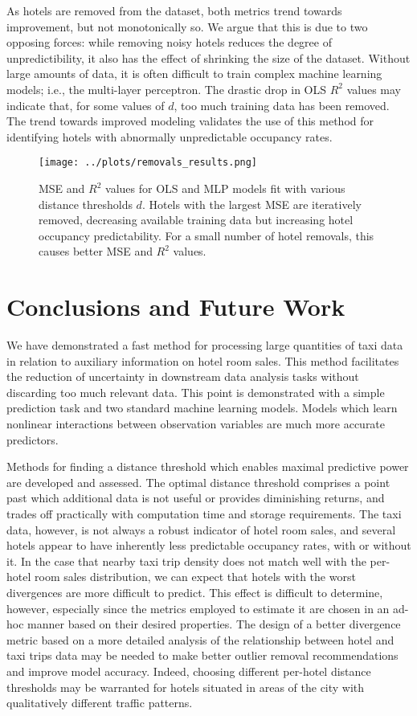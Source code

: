 \documentclass[useAMS, usenatbib]{biom}
\begin{document}
As hotels are removed from the dataset, both metrics trend towards improvement, but not monotonically so. We argue that this is due to two opposing forces: while removing noisy hotels reduces the degree of unpredictibility, it also has the effect of shrinking the size of the dataset. Without large amounts of data, it is often difficult to train complex machine learning models; i.e., the multi-layer perceptron. The drastic drop in OLS $R^2$ values may indicate that, for some values of $d$, too much training data has been removed. The trend towards improved modeling validates the use of this method for identifying hotels with abnormally unpredictable occupancy rates.

\begin{figure}
	\centering
    \captionsetup{justification=centering}
	\texttt{[image: ../plots/removals\_results.png]}
	\caption{MSE and $R^2$ values for OLS and MLP models fit with various distance thresholds $d$. Hotels with the largest MSE are iteratively removed, decreasing available training data but increasing hotel occupancy predictability. For a small number of hotel removals, this causes better MSE and $R^2$ values.}
	\label{fig:removals}
\end{figure}

\section{Conclusions and Future Work}
\label{s:conclusion}

We have demonstrated a fast method for processing large quantities of taxi data in relation to auxiliary information on hotel room sales. This method facilitates the reduction of uncertainty in downstream data analysis tasks without discarding too much relevant data. This point is demonstrated with a simple prediction task and two standard machine learning models. Models which learn nonlinear interactions between observation variables are much more accurate predictors.

Methods for finding a distance threshold which enables maximal predictive power are developed and assessed. The optimal distance threshold comprises a point past which additional data is not useful or provides diminishing returns, and trades off practically with computation time and storage requirements. The taxi data, however, is not always a robust indicator of hotel room sales, and several hotels appear to have inherently less predictable occupancy rates, with or without it. In the case that nearby taxi trip density does not match well with the per-hotel room sales distribution, we can expect that hotels with the worst divergences are more difficult to predict. This effect is difficult to determine, however, especially since the metrics employed to estimate it are chosen in an ad-hoc manner based on their desired properties. The design of a better divergence metric based on a more detailed analysis of the relationship between hotel and taxi trips data may be needed to make better outlier removal recommendations and improve model accuracy. Indeed, choosing different per-hotel distance thresholds may be warranted for hotels situated in areas of the city with qualitatively different traffic patterns.
\end{document}
